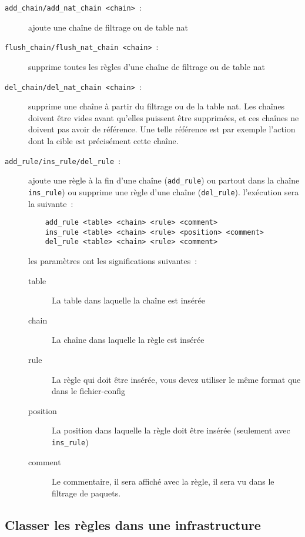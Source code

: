 \begin{description}
\item [\texttt{add\_chain/add\_nat\_chain <chain>}~:]
   ajoute une chaîne de \og{}filtrage\fg{} ou de table \og{}nat\fg{}
\item [\texttt{flush\_chain/flush\_nat\_chain <chain>}~:]
   supprime toutes les règles d'une chaîne de \og{}filtrage\fg{} ou de table \og{}nat\fg{}
\item [\texttt{del\_chain/del\_nat\_chain <chain>}~:]
   supprime une chaîne à partir du \og{}filtrage\fg{} ou de la table \og{}nat\fg{}.
   Les chaînes doivent être vides avant qu'elles puissent être supprimées, et ces chaînes
   ne doivent pas avoir de référence. Une telle référence est par exemple l'action 
   dont la cible est précisément cette chaîne.
\item[\texttt{add\_rule/ins\_rule/del\_rule}~:]
   ajoute une règle à la fin d'une chaîne (\texttt{add\_rule}) ou partout dans la chaîne
   \texttt{ins\_rule}) ou supprime une règle d'une chaîne (\texttt{del\_rule}). l'exécution
   sera la suivante~:

\begin{example}
\begin{verbatim}
    add_rule <table> <chain> <rule> <comment>
    ins_rule <table> <chain> <rule> <position> <comment>
    del_rule <table> <chain> <rule> <comment>
\end{verbatim}
\end{example}

  \noindent les paramètres ont les significations suivantes~:
  \begin{description}
  \item[table] La table dans laquelle la chaîne est insérée
  \item[chain] La chaîne dans laquelle la règle est insérée
  \item[rule] La règle qui doit être insérée, vous devez utiliser le même
    format que dans le fichier-config
  \item[position] La position dans laquelle la règle doit être insérée
    (seulement avec \texttt{ins\_rule})
  \item[comment] Le commentaire, il sera affiché avec la règle, il sera vu
    dans le filtrage de paquets.
  \end{description}
\end{description}


\subsection{Classer les règles dans une infrastructure}

